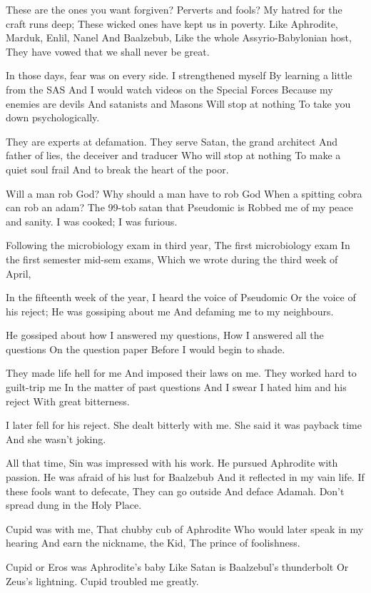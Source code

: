 \documentclass[
]{book}
\begin{document}
These are the ones you want forgiven?
Perverts and fools?
My hatred for the craft runs deep;
These wicked ones have kept us in poverty.
Like Aphrodite, Marduk, Enlil, Nanel
And Baalzebub,
Like the whole Assyrio-Babylonian host,
They have vowed that we shall never be great.

In those days, fear was on every side.
I strengthened myself
By learning a little from the SAS
And I would watch videos on the Special Forces
Because my enemies are devils
And satanists and Masons
Will stop at nothing
To take you down psychologically.

They are experts at defamation.
They serve Satan, the grand architect
And father of lies, the deceiver and traducer
Who will stop at nothing
To make a quiet soul frail
And to break the heart of the poor.

Will a man rob God?
Why should a man have to rob God
When a spitting cobra can rob an adam?
The 99-tob satan that Pseudomic is
Robbed me of my peace and sanity.
I was cooked; I was furious.

Following the microbiology exam in third year,
The first microbiology exam
In the first semester mid-sem exams,
Which we wrote during the third week of April,

In the fifteenth week of the year,
I heard the voice of Pseudomic
Or the voice of his reject;
He was gossiping about me
And defaming me to my neighbours.

He gossiped about how I answered my questions,
How I answered all the questions
On the question paper
Before I would begin to shade.

They made life hell for me
And imposed their laws on me.
They worked hard to guilt-trip me
In the matter of past questions
And I swear I hated him and his reject
With great bitterness.

I later fell for his reject.
She dealt bitterly with me.
She said it was payback time
And she wasn't joking.

All that time,
Sin was impressed with his work.
He pursued Aphrodite with passion.
He was afraid of his lust for Baalzebub
And it reflected in my vain life.
If these fools want to defecate,
They can go outside
And deface Adamah.
Don't spread dung in the Holy Place.

Cupid was with me,
That chubby cub of Aphrodite
Who would later speak in my hearing
And earn the nickname, the Kid,
The prince of foolishness.

Cupid or Eros was Aphrodite's baby
Like Satan is Baalzebul's thunderbolt
Or Zeus's lightning.
Cupid troubled me greatly.
\end{document}
